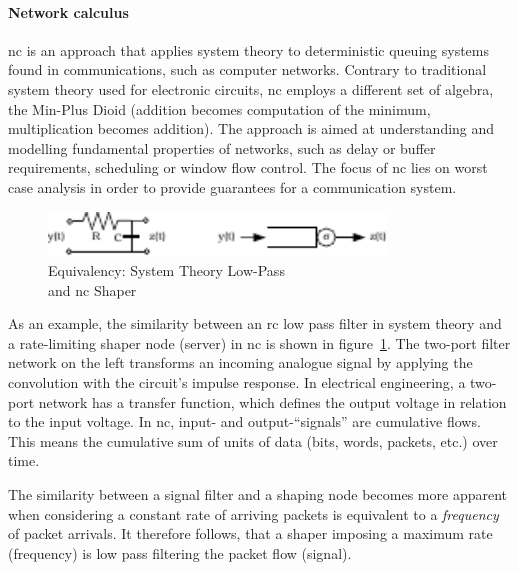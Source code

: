 \paragraph{Network calculus} \gls{nc} is an approach that applies system theory to deterministic queuing systems found in communications, such as computer networks.
Contrary to traditional system theory used for electronic circuits, \gls{nc} employs a different set of algebra, the Min-Plus Dioid (addition becomes computation of the minimum, multiplication becomes addition).
The approach is aimed at understanding and modelling fundamental properties of networks, such as delay or buffer requirements, scheduling or window flow control.
The focus of \gls{nc} lies on worst case analysis in order to provide guarantees for a communication system.
%
\begin{figure}[H]
  \centering
  \includegraphics*[width=0.8\textwidth,height=\textheight,keepaspectratio]{Figures/nc_basics3_RC_sigma}
  \caption{Equivalency: System Theory Low-Pass\\and \gls{nc} Shaper~\cite{thiran_network_2001}}
  \label{fig:nc_sigma}
\end{figure}
%
As an example, the similarity between an \gls{rc} low pass filter in system theory and a rate-limiting shaper node (server) in \gls{nc} is shown in
figure~\ref{fig:nc_sigma}. The two-port filter network on the left transforms an incoming analogue signal by applying the convolution with the circuit's impulse response.
In electrical engineering, a two-port network has a transfer function, which defines the output voltage in relation to the input voltage.
In \gls{nc}, input- and output-\enquote{signals} are cumulative flows. This means the cumulative sum of units of data (bits, words, packets, etc.) over time.
\par
The similarity between a signal filter and a shaping node becomes more apparent when considering a constant rate of arriving packets is equivalent to a \emph{frequency} of packet arrivals.
It therefore follows, that a shaper imposing a maximum rate (frequency) is low pass filtering the packet flow (signal).

